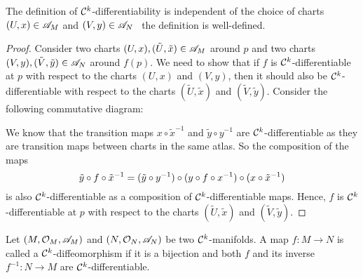 \begin{proposition}
	The definition of \(\mathcal C^{k}\)-differentiability is independent of the choice of charts \((U, x) \in \mathscr{A}_M\) and \((V, y) \in \mathscr{A}_N\) \ie\ the definition is well-defined.
\end{proposition}
\begin{proof}
	Consider two charts \((U, x), (\tilde{U}, \tilde{x}) \in \mathscr{A}_M\) around \(p\) and two charts \((V, y), (\tilde{V}, \tilde{y}) \in \mathscr{A}_N\) around \(f(p)\). We need to show that if \(f\) is \(\mathcal C^{k}\)-differentiable at \(p\) with respect to the charts \((U, x)\) and \((V, y)\), then it should also be \(\mathcal C^{k}\)-differentiable with respect to the charts \((\tilde{U}, \tilde{x})\) and \((\tilde{V}, \tilde{y})\). Consider the following commutative diagram:
	\begin{figure}[H]
		\centering
	\end{figure}
	We know that the transition maps \(x \circ \tilde{x}^{-1}\) and \(\tilde{y} \circ y^{-1}\) are \(\mathcal C^{k}\)-differentiable as they are transition maps between charts in the same atlas. So the composition of the maps
	\begin{equation}
		\tilde{y} \circ f \circ \tilde{x}^{-1} = (\tilde{y} \circ y^{-1}) \circ (y \circ f \circ x^{-1}) \circ (x \circ \tilde{x}^{-1})
	\end{equation}
	is also \(\mathcal C^{k}\)-differentiable as a composition of \(\mathcal C^{k}\)-differentiable maps. Hence, \(f\) is \(\mathcal C^{k}\)-differentiable at \(p\) with respect to the charts \((\tilde{U}, \tilde{x})\) and \((\tilde{V}, \tilde{y})\).
\end{proof}

\begin{definition}[Diffeomorphism]
	Let \((M, \mathcal{O}_M, \mathscr{A}_M)\) and \((N, \mathcal{O}_N, \mathscr{A}_N)\) be two \(\mathcal C^{k}\)-manifolds. A map \(f: M \to N\) is called a \(\mathcal C^{k}\)-diffeomorphism if it is a bijection and both \(f\) and its inverse \(f^{-1}: N \to M\) are \(\mathcal C^{k}\)-differentiable.
\end{definition}


